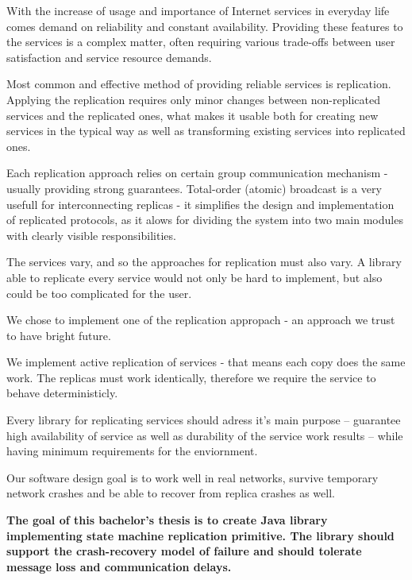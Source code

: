 
With the increase of usage and importance of Internet services in everyday life comes demand on reliability and constant availability.
Providing these features to the services is a complex matter, often requiring various trade-offs between user satisfaction and service resource demands.

Most common and effective method of providing reliable services is replication. Applying the replication requires only minor changes between non-replicated services and the replicated ones, what makes it usable both for creating new services in the typical way %
as well as transforming existing services into replicated ones.

Each replication approach relies on certain group communication mechanism - usually providing strong guarantees. Total-order (atomic) broadcast is a very usefull for interconnecting replicas - it simplifies the design and implementation of replicated protocols, as it alows for dividing the system into two main modules with clearly visible responsibilities.

The services vary, and so the approaches for replication must also vary. A library able to replicate every service would not only be hard to implement, but also could be too complicated for the user.

We chose to implement one of the replication appropach - an approach we trust to have bright future.

We implement active replication of services - that means each copy does the same work. The replicas must work identically, therefore we require the service to behave deterministicly.

Every library for replicating services should adress it's main purpose -- guarantee high availability of service as well as durability of the service work results -- while having minimum requirements for the enviornment.

Our software design goal is to work well in real networks, survive temporary network crashes and be able to recover from replica crashes as well.

{
\bfseries
The goal of this bachelor's thesis is to create Java library implementing state machine replication primitive. The library should support the crash-recovery model of failure and should tolerate message loss and communication delays.
}

